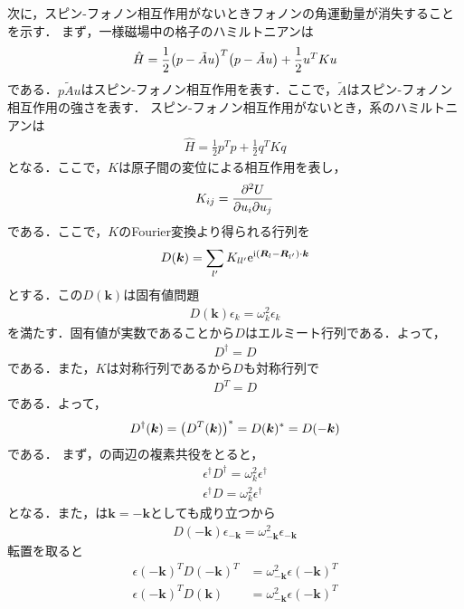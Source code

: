 \documentclass{report}
\begin{document}
次に，スピン-フォノン相互作用がないときフォノンの角運動量が消失することを示す．
まず，一様磁場中の格子のハミルトニアンは
\begin{align}
  \hat{H} = \frac{1}{2}\qty(p - \tilde{A}u)^T \qty(p - \tilde{A}u) + \frac{1}{2} u^T K u \label{spin-phonon}
\end{align}
である．$p \tilde{A}u$はスピン-フォノン相互作用を表す．ここで，$\tilde{A}$はスピン-フォノン相互作用の強さを表す．
スピン-フォノン相互作用がないとき，系のハミルトニアンは
\begin{align}
  \hat{H} = \frac{1}{2} p^T p + \frac{1}{2} q^T K q \label{no-spin-phonon}
\end{align}
となる．ここで，$K$は原子間の変位による相互作用を表し，
\begin{align}
  K_{ij}  = \pdv[2]{U}{u_i}{u_j}
\end{align}
である．ここで，$K$のFourier変換より得られる行列を
\begin{align}
  D(\bm{k}) = \sum_{l'} K_{ll'} \mathrm{e}^{\mathrm{i}(\bm{R}_l - \bm{R}_{l'})\cdot\bm{k}}
\end{align}
とする．この$D(\bm{k})$は固有値問題
\begin{align}
  D(\bm{k})\epsilon_k = \omega_k^2 \epsilon_k \label{eigen}
\end{align}
を満たす．固有値が実数であることから$D$はエルミート行列である．よって，
\begin{align}
  D^\dagger = D
\end{align}
である．また，$K$は対称行列であるから$D$も対称行列で
\begin{align}
  D^T = D
\end{align}
である．よって，
\begin{align}
  D^\dagger(\bm{k}) = \qty(D^T(\bm{k}))^{*} = D(\bm{k})^{*} = D(-\bm{k})
\end{align}
である．
まず，の両辺の複素共役をとると，
\begin{align}
  \epsilon^\dagger D^\dagger = \omega_k^2 \epsilon^\dagger\\
  \epsilon^\dagger D = \omega_k^2 \epsilon^\dagger
\end{align}
となる．また，は$\bm{k} = -\bm{k}$としても成り立つから
\begin{align}
  D(-\bm{k})\epsilon_{-\bm{k}} = \omega_{-\bm{k}}^2 \epsilon_{-\bm{k}}
\end{align}
転置を取ると
\begin{align}
  \epsilon(-\bm{k})^T D(-\bm{k})^T &= \omega_{-\bm{k}}^2 \epsilon(-\bm{k})^T\\
  \epsilon(-\bm{k})^T D(\bm{k}) &= \omega_{-\bm{k}}^2 \epsilon(-\bm{k})^T
\end{align}
\end{document}
